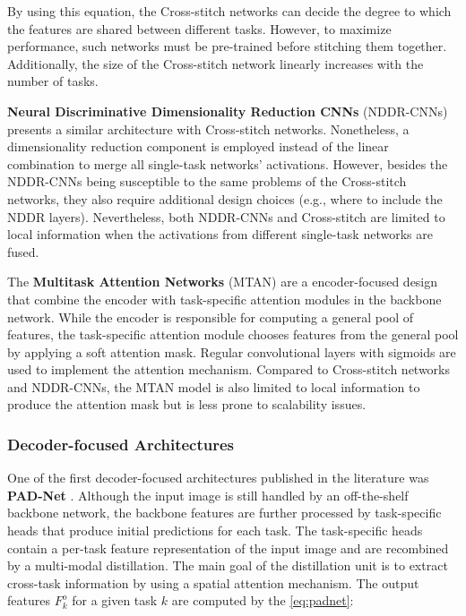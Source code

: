 By using this equation, the Cross-stitch networks can decide the degree to which the features are shared between different tasks. However, to maximize performance, such networks must be pre-trained before stitching them together. Additionally, the size of the Cross-stitch network linearly increases with the number of tasks. 

\textbf{Neural Discriminative Dimensionality Reduction CNNs} (NDDR-CNNs) \citep{gao2019nddr} presents a similar architecture with Cross-stitch networks. Nonetheless, a dimensionality reduction component is employed instead of the linear combination to merge all single-task networks' activations. However, besides the NDDR-CNNs being susceptible to the same problems of the Cross-stitch networks, they also require additional design choices (e.g., where to include the NDDR layers). Nevertheless, both NDDR-CNNs and Cross-stitch are limited to local information when the activations from different single-task networks are fused.

The \textbf{Multitask Attention Networks} (MTAN) \citep{liu2019end} are a encoder-focused design that combine the encoder with task-specific attention modules in the backbone network. While the encoder is responsible for computing a general pool of features, the task-specific attention module chooses features from the general pool by applying a soft attention mask. Regular convolutional layers with sigmoids are used to implement the attention mechanism. Compared to Cross-stitch networks and NDDR-CNNs, the MTAN model is also limited to local information to produce the attention mask but is less prone to scalability issues.

\subsubsection{Decoder-focused Architectures}

One of the first decoder-focused architectures published in the literature was \textbf{PAD-Net} \citep{xu2018pad}. Although the input image is still handled by an off-the-shelf backbone network, the backbone features are further processed by task-specific heads that produce initial predictions for each task. The task-specific heads contain a per-task feature representation of the input image and are recombined by a multi-modal distillation. The main goal of the distillation unit is to extract cross-task information by using a spatial attention mechanism. The output features $F_k^o$ for a given task $k$ are computed by the \autoref{eq:padnet}:


